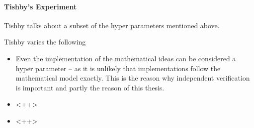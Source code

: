 \documentclass[dissertation.tex]{subfiles}
\begin{document}
\paragraph{Tishby's Experiment} 

Tishby\cite{TISBHY} talks about a subset of the hyper parameters mentioned
above. 

Tishby varies the following 
\begin{itemize}
  \item{
      Even the implementation of the mathematical ideas can be considered a
      hyper parameter -- as it is unlikely that implementations follow the
      mathematical model exactly. This is the reason why independent
      verification is important and partly the reason of this thesis.
    }
  \item{
      <++>
    }
  \item{
      <++>
    }
\end{itemize}
\end{document}
